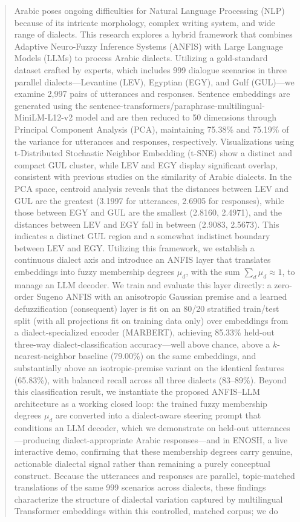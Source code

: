 \documentclass[conference]{IEEEtran}
\begin{document}
\begin{abstract}
Arabic poses ongoing difficulties for Natural Language Processing (NLP) because of its intricate morphology, complex writing system, and wide range of dialects. This research explores a hybrid framework that combines Adaptive Neuro-Fuzzy Inference Systems (ANFIS) with Large Language Models (LLMs) to process Arabic dialects. Utilizing a gold-standard dataset crafted by experts, which includes 999 dialogue scenarios in three parallel dialects---Levantine (LEV), Egyptian (EGY), and Gulf (GUL)---we examine 2,997 pairs of utterances and responses. Sentence embeddings are generated using the sentence-transformers/paraphrase-multilingual-MiniLM-L12-v2 model and are then reduced to 50 dimensions through Principal Component Analysis (PCA), maintaining 75.38\% and 75.19\% of the variance for utterances and responses, respectively. Visualizations using t-Distributed Stochastic Neighbor Embedding (t-SNE) show a distinct and compact GUL cluster, while LEV and EGY display significant overlap, consistent with previous studies on the similarity of Arabic dialects. In the PCA space, centroid analysis reveals that the distances between LEV and GUL are the greatest (3.1997 for utterances, 2.6905 for responses), while those between EGY and GUL are the smallest (2.8160, 2.4971), and the distances between LEV and EGY fall in between (2.9083, 2.5673). This indicates a distinct GUL region and a somewhat indistinct boundary between LEV and EGY. Utilizing this framework, we establish a continuous dialect axis and introduce an ANFIS layer that translates embeddings into fuzzy membership degrees $\mu_d$, with the sum $\sum_d \mu_d \approx 1$, to manage an LLM decoder. We train and evaluate this layer directly: a zero-order Sugeno ANFIS with an anisotropic Gaussian premise and a learned defuzzification (consequent) layer is fit on an 80/20 stratified train/test split (with all projections fit on training data only) over embeddings from a dialect-specialized encoder (MARBERT), achieving 85.33\% held-out three-way dialect-classification accuracy---well above chance, above a $k$-nearest-neighbor baseline (79.00\%) on the same embeddings, and substantially above an isotropic-premise variant on the identical features (65.83\%), with balanced recall across all three dialects (83--89\%). Beyond this classification result, we instantiate the proposed ANFIS--LLM architecture as a working closed loop: the trained fuzzy membership degrees $\mu_d$ are converted into a dialect-aware steering prompt that conditions an LLM decoder, which we demonstrate on held-out utterances---producing dialect-appropriate Arabic responses---and in ENOSH, a live interactive demo, confirming that these membership degrees carry genuine, actionable dialectal signal rather than remaining a purely conceptual construct. Because the utterances and responses are parallel, topic-matched translations of the same 999 scenarios across dialects, these findings characterize the structure of dialectal variation captured by multilingual Transformer embeddings within this controlled, matched corpus; we do 
\end{abstract}
\end{document}
